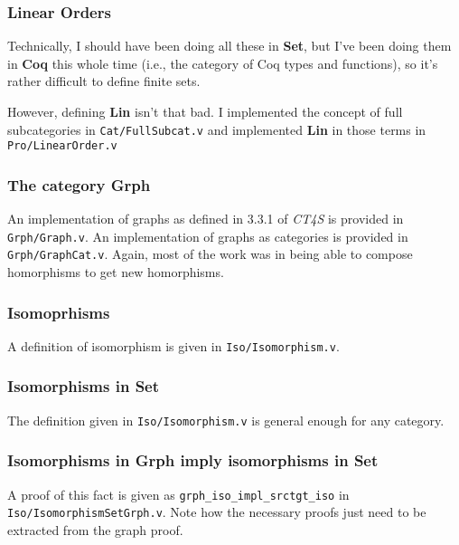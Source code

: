 \documentclass[12pt,twocolumn,oneside]{book}
\begin{document}
\subsubsection{Linear Orders}

Technically, I should have been doing all these in \textbf{Set}, but I've been
doing them in \textbf{Coq} this whole time (i.e., the category of Coq
types and functions), so it's rather difficult to define finite sets.

However, defining \textbf{Lin} isn't that bad. I implemented the concept of full
subcategories in \texttt{Cat/FullSubcat.v} and implemented \textbf{Lin} in those terms
in \texttt{Pro/LinearOrder.v}

\subsubsection{The category \textbf{Grph}}

An implementation of graphs as defined in 3.3.1 of \emph{CT4S} is provided in
\texttt{Grph/Graph.v}. An implementation of graphs as categories is provided in
\texttt{Grph/GraphCat.v}. Again, most of the work was in being able to compose homorphisms
to get new homorphisms.

\subsubsection{Isomoprhisms}

A definition of isomorphism is given in \texttt{Iso/Isomorphism.v}.

\subsubsection{Isomorphisms in \textbf{Set}}

The definition given in \texttt{Iso/Isomorphism.v} is general enough for any category.

\subsubsection{Isomorphisms in \textbf{Grph} imply isomorphisms in \textbf{Set}}

A proof of this fact is given as \texttt{grph\_iso\_impl\_srctgt\_iso} in \texttt{Iso/IsomorphismSetGrph.v}.
Note how the necessary proofs just need to be extracted from the graph proof.
\end{document}
